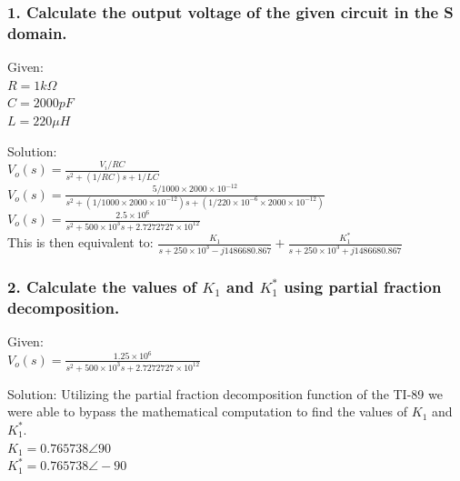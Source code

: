 \documentclass[11pt]{article}
\begin{document}
	\subsubsection*{1. Calculate the output voltage of the given circuit in the S domain.}
	\par{Given:}\\
	$R=1k\Omega$\\
	$C=2000 pF$\\
	$L=220\mu H$
	\par{Solution:}\\
	$V_{o}(s)= \frac{V_{i}/RC}{s^{2}+(1/RC)s+1/LC}$\\
	$V_{o}(s)= \frac{5/1000\times2000\times 10^{-12}}{s^{2}+(1/1000\times2000\times 10^{-12})s+(1/220\times10^{-6}\times2000\times 10^{-12})}$\\
	$V_{o}(s)= \frac{2.5\times10^{6}}{s^{2}+500\times10^{3}s+2.7272727\times10^{12}}$\\
	This is then equivalent to:
	$\frac{K_{1}}{s+250\times 10^{3}-j1486680.867}+\frac{K^{*}_{1}}{s+250\times 10^{3}+j1486680.867}$
	\subsubsection*{2. Calculate the values of $K_{1}$ and $K^{*}_{1}$ using partial fraction decomposition.}
	\par{Given:}\\
	$V_{o}(s)= \frac{1.25\times10^{6}}{s^{2}+500\times10^{3}s+2.7272727\times10^{12}}$\\
	\par{Solution:}
	Utilizing the partial fraction decomposition function of the TI-89 we were able to bypass the mathematical computation to find the values of $K_{1}$ and $K^{*}_{1}$.\\
	$K_{1}=0.765738\angle90$\\
	$K^{*}_{1}=0.765738\angle-90$
\end{document}
